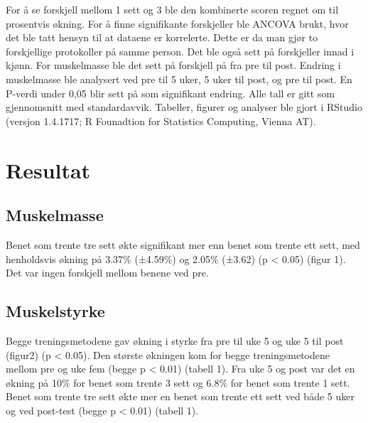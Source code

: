 \documentclass[
]{book}
\begin{document}
For å se forskjell mellom 1 sett og 3 ble den kombinerte scoren regnet om til prosentvis økning. For å finne signifikante forskjeller ble ANCOVA brukt, hvor det ble tatt hensyn til at dataene er korrelerte. Dette er da man gjør to forskjellige protokoller på samme person. Det ble også sett på forskjeller innad i kjønn. For muskelmasse ble det sett på forskjell på fra pre til post. Endring i muskelmasse ble analysert ved pre til 5 uker, 5 uker til post, og pre til post. En P-verdi under 0,05 blir sett på som signifikant endring. Alle tall er gitt som gjennomsnitt med standardavvik. Tabeller, figurer og analyser ble gjort i RStudio (versjon 1.4.1717; R Founadtion for Statistics Computing, Vienna AT).

\hypertarget{resultat-1}{%
\section{Resultat}\label{resultat-1}}

\hypertarget{muskelmasse}{%
\subsection{Muskelmasse}\label{muskelmasse}}

Benet som trente tre sett økte signifikant mer enn benet som trente ett sett, med henholdsvis økning på 3.37\% (±4.59\%) og 2.05\% (±3.62) (p \textless{} 0.05) (figur 1). Det var ingen forskjell mellom benene ved pre.

\hypertarget{muskelstyrke}{%
\subsection{Muskelstyrke}\label{muskelstyrke}}

Begge treningsmetodene gav økning i styrke fra pre til uke 5 og uke 5 til post (figur2) (p \textless{} 0.05). Den største økningen kom for begge treningsmetodene mellom pre og uke fem (begge p \textless{} 0.01) (tabell 1). Fra uke 5 og post var det en økning på 10\% for benet som trente 3 sett og 6.8\% for benet som trente 1 sett. Benet som trente tre sett økte mer en benet som trente ett sett ved både 5 uker og ved post-test (begge p \textless{} 0.01) (tabell 1).
\end{document}
